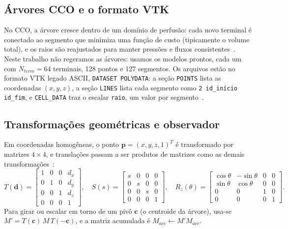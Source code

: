 \documentclass[11pt, a4paper]{article}
\begin{document}
\subsection{Árvores CCO e o formato VTK}
No CCO, a árvore cresce dentro de um domínio de perfusão: cada novo terminal é conectado ao segmento que minimiza uma função de custo (tipicamente o volume total), e os raios são reajustados para manter pressões e fluxos consistentes~\cite{schreiner1993}. Neste trabalho não regeramos as árvores: usamos os modelos prontos, cada um com $N_{term}=64$ terminais, 128 pontos e 127 segmentos. Os arquivos estão no formato VTK legado ASCII, \texttt{DATASET POLYDATA}: a seção \texttt{POINTS} lista as coordenadas $(x,y,z)$, a seção \texttt{LINES} lista cada segmento como \texttt{2 id\_início id\_fim}, e \texttt{CELL\_DATA} traz o escalar \texttt{raio}, um valor por segmento~\cite{vtk}.

\subsection{Transformações geométricas e observador}
Em coordenadas homogêneas, o ponto $\mathbf{p}=(x,y,z,1)^T$ é transformado por matrizes $4\times4$, e translações passam a ser produtos de matrizes como as demais transformações~\cite{foley,hearn}:
\begin{equation}
T(\mathbf{d})=\begin{bmatrix}1&0&0&d_x\\0&1&0&d_y\\0&0&1&d_z\\0&0&0&1\end{bmatrix},\quad
S(s)=\begin{bmatrix}s&0&0&0\\0&s&0&0\\0&0&s&0\\0&0&0&1\end{bmatrix},\quad
R_z(\theta)=\begin{bmatrix}\cos\theta&-\sin\theta&0&0\\\sin\theta&\cos\theta&0&0\\0&0&1&0\\0&0&0&1\end{bmatrix}.
\end{equation}
Para girar ou escalar em torno de um pivô $\mathbf{c}$ (o centroide da árvore), usa-se $M' = T(\mathbf{c})\,M\,T(-\mathbf{c})$, e a matriz acumulada é $M_{acc} \leftarrow M' M_{acc}$.
\end{document}
